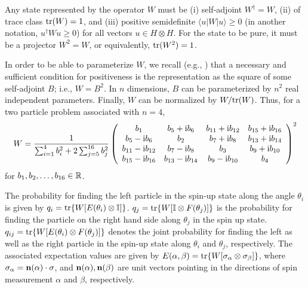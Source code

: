 Any state represented by the operator $W$ must be
(i) self-adjoint $W^\dagger =W$,
(ii) of trace class ${\rm tr} (W)=1$, and
(iii) positive semidefinite
$\langle u | W | u \rangle \ge 0$
(in another notation, $u^\dagger Wu\ge 0$)
for all vectors $u\in H\otimes H$.
For the state to be pure, it must be a projector $W^2=W$,
or equivalently, ${\rm tr}(W^2)=1$.

In order to be able to parameterize $W$,
we recall (e.g., \cite[\S 72]{halmos-vs})
that a necessary and sufficient condition for
positiveness is the representation as the square of
some self-adjoint $B$; i.e., $W=B^2$.
In $n$ dimensions, $B$ can be parameterized by $n^2$
real independent parameters. Finally, $W$ can be normalized
by $W/ {\rm tr}(W)$.
Thus, for a two particle problem associated with $n=4$,
\begin{equation}
    \label{e-2003-qpoly-2}
    W=\frac{1}{\sum_{i=1}^4 b_i^2 + 2 \sum_{j=5}^{16} b_j^2}\left(\begin{array}{cccc}
        b_1 & b_5 + {\rm i}b_6 & b_{11} + {\rm i}b_{12} & b_{15} + {\rm i}b_{16}\\
        b_5 - {\rm i}b_6 & b_2 & b_7 + {\rm i}b_8 & b_{13} + {\rm i}b_{14}\\
        b_{11} - {\rm i}b_{12} & b_7 - {\rm i}b_8 & b_3 & b_9 + {\rm i}b_{10}\\
        b_{15} - {\rm i}b_{16} & b_{13} - {\rm i}b_{14} & b_9 - {\rm i}b_{10} &b_4
      \end{array}\right)^2
\end{equation}
for $b_1,b_2,\ldots ,b_{16}\in {\Bbb R}$.

The probability for finding the left particle in the spin-up state
along the angle $\theta_i$ is given  by
$q_i = {\rm tr}\{{W} [{E}(\theta_i) \otimes {\Bbb I}]\}$.
$q_j = {\rm tr}\{{W} [{\Bbb I} \otimes {F}(\theta_j)]\}$ is
the probability for finding the particle on the right hand side along $\theta_j$ in the
spin up state.
$q_{ij} = {\rm tr}\{{W} [{E}(\theta_i) \otimes {F}(\theta_j)]\}$ denotes the joint probability
for finding the left as well as the right particle in the spin-up state along $\theta_i$ and $\theta_j$,
respectively.
The associated expectation values are given by
$E(\alpha,\beta)={\rm tr}\{{W} [{\bf \sigma}_\alpha  \otimes
{\bf \sigma}_\beta ]\}$,
where $\sigma_\alpha= {\bf n}(\alpha )\cdot {\bf \sigma}$,
and ${\bf n}(\alpha ),{\bf n}(\beta )$
are unit vectors pointing in the directions
of spin measurement $\alpha$ and $\beta$, respectively.

